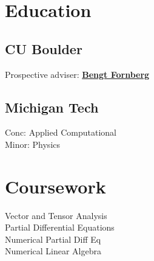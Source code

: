 \documentclass[letterpaper]{deedy-resume} %
\begin{document}

\lastupdated %



\begin{minipage}[t]{0.33\textwidth} %


\section{Education} 

\subsection{CU Boulder}
Prospective adviser: \href{colorado.edu/amath/bengt-fornberg-0}{\textbf{Bengt Fornberg}}

\sectionspace

\subsection{Michigan Tech}
Conc: Applied Computational \\
Minor: Physics

\sectionspace %


\section{Coursework}
Vector and Tensor Analysis \\
Partial Differential Equations \\
Numerical Partial Diff Eq \\
Numerical Linear Algebra


\end{minipage}
\end{document}
